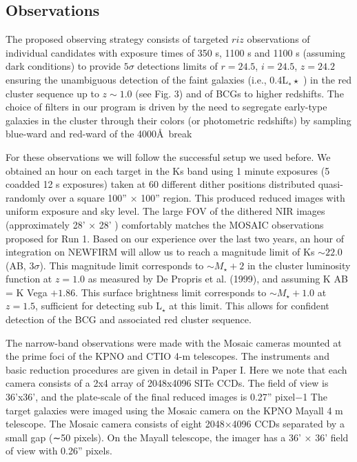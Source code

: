 \documentclass[apj, revtex4]{emulateapj}
\begin{document}
\subsection{Observations}\label{sec: observations}

The proposed observing strategy consists of targeted $riz$ observations of individual candidates with
exposure times of 350 s, 1100 s and 1100 s (assuming dark conditions) to provide $5\sigma$ detections
limits of $r = 24.5$, $i = 24.5$, $z = 24.2$ ensuring the unambiguous detection of the faint galaxies
(i.e., 0.4L$_∗\star$ ) in the red cluster sequence up to $z \sim 1.0$ (see Fig. 3) and of BCGs to higher redshifts.
The choice of filters in our program is driven by the need to segregate early-type galaxies in the
cluster through their colors (or photometric redshifts) by sampling blue-ward and red-ward of the
4000\AA\ break

For these observations we will follow the successful setup we used before. We obtained an hour
on each target in the Ks band using 1 minute exposures (5 coadded 12 s exposures) taken at
60 different dither positions distributed quasi-randomly over a square 100'' × 100'' region. This
produced reduced images with uniform exposure and sky level. The large FOV of the dithered NIR
images (approximately 28' × 28' ) comfortably matches the MOSAIC observations proposed for Run
1.
Based on our experience over the last two years, an hour of integration on NEWFIRM will allow us
to reach a magnitude limit of Ks $\sim 22.0$ (AB, $3\sigma$). This magnitude limit corresponds to $\sim M_{\star} + 2$
in the cluster luminosity function at $z = 1.0$ as measured by De Propris et al. (1999), and assuming
K AB = K Vega $+ 1.86$. This surface brightness limit corresponds to $\sim M_{\star} + 1.0$ at $z = 1.5$, sufficient
for detecting sub L$_{\star}$ at this limit. This allows for confident detection of the BCG and associated red
cluster sequence.

The narrow-band observations were made with the Mosaic cameras mounted at the
prime foci of the KPNO and CTIO 4-m telescopes. The instruments and basic reduction
procedures are given in detail in Paper I. Here we note that each camera consists of a 2x4
array of 2048x4096 SITe CCDs. The field of view is 36’x36’, and the plate-scale of the
final reduced images is 0.27” pixel−1
The target galaxies were imaged using the Mosaic camera on
the KPNO Mayall 4 m telescope. The Mosaic camera consists of
eight 2048×4096 CCDs separated by a small gap (∼50 pixels).
On the Mayall telescope, the imager has a 36' × 36' field of
view with 0.26'' pixels.
\end{document}
